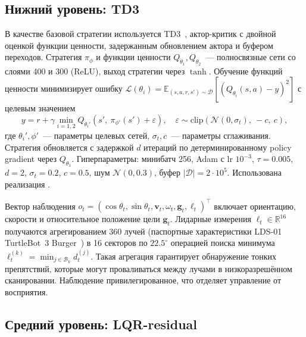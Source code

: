 \documentclass[11pt]{article}
\begin{document}
\subsection{Нижний уровень: TD3}
\label{sec:reactive}

В качестве базовой стратегии используется TD3~\cite{fujimoto2018td3}, актор-критик с двойной оценкой функции ценности, задержанным обновлением актора и буфером переходов. Стратегия $\pi_\phi$ и функции ценности $Q_{\theta_1}, Q_{\theta_2}$~--- полносвязные сети со слоями 400 и 300 (ReLU), выход стратегии через $\tanh$. Обучение функций ценности минимизирует ошибку $\mathcal{L}(\theta_i) = \mathbb{E}_{(s,a,r,s') \sim \mathcal{D}}[(Q_{\theta_i}(s,a) - y)^2]$ с целевым значением
\begin{equation}
y = r + \gamma \min_{i=1,2} Q_{\theta_i'}\left( s',\ \pi_{\phi'}(s') + \varepsilon \right),\quad \varepsilon \sim \mathrm{clip}(\mathcal{N}(0, \sigma_t),\ -c,\ c),
\end{equation}
где $\theta_i', \phi'$~--- параметры целевых сетей, $\sigma_t, c$~--- параметры сглаживания. Стратегия обновляется с задержкой $d$ итераций по детерминированному policy gradient через $Q_{\theta_1}$.
Гиперпараметры: минибатч 256, Adam с lr $10^{-3}$, $\tau = 0.005$, $d = 2$, $\sigma_t = 0.2$, $c = 0.5$, шум $\mathcal{N}(0, 0.3)$, буфер $|\mathcal{D}| = 2 \cdot 10^5$. Использована реализация \cite{raffin2021sb3}.

Вектор наблюдения $o_t = (\cos\theta_t, \sin\theta_t, \mathbf{v}_t, \omega_t, \mathbf{g}_t, \ell_t)^\top$ включает ориентацию, скорости и относительное положение цели $\mathbf{g}_t$. Лидарные измерения $\ell_t \in \mathbb{R}^{16}$ получаются агрегированием 360 лучей (паспортные характеристики LDS-01 TurtleBot~3 Burger~\cite{lds01_datasheet}) в 16 секторов по $22.5^\circ$ операцией поиска минимума $\ell_t^{(k)} = \min_{j \in \mathcal{B}_k} d_t^{(j)}$. Такая агрегация гарантирует обнаружение тонких препятствий, которые могут проваливаться между лучами в низкоразрешённом сканировании. Наблюдение привилегированное, что отделяет управление от восприятия.


\subsection{Средний уровень: LQR-residual}
\label{sec:tactical}
\end{document}
